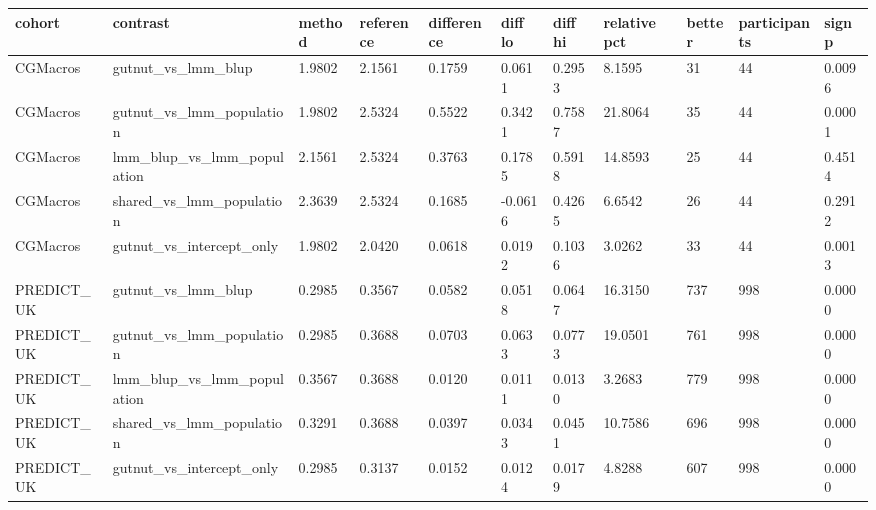 {\footnotesize\setlength{\tabcolsep}{3pt}
\begin{longtable}{lllllllllll}
\toprule
\textbf{cohort} & \textbf{contrast} & \textbf{method} & \textbf{reference} & \textbf{difference} & \textbf{diff lo} & \textbf{diff hi} & \textbf{relative pct} & \textbf{better} & \textbf{participants} & \textbf{sign p} \\
\midrule
\endhead
CGMacros & gutnut\_vs\_lmm\_blup & 1.9802 & 2.1561 & 0.1759 & 0.0611 & 0.2953 & 8.1595 & 31 & 44 & 0.0096 \\
CGMacros & gutnut\_vs\_lmm\_population & 1.9802 & 2.5324 & 0.5522 & 0.3421 & 0.7587 & 21.8064 & 35 & 44 & 0.0001 \\
CGMacros & lmm\_blup\_vs\_lmm\_population & 2.1561 & 2.5324 & 0.3763 & 0.1785 & 0.5918 & 14.8593 & 25 & 44 & 0.4514 \\
CGMacros & shared\_vs\_lmm\_population & 2.3639 & 2.5324 & 0.1685 & -0.0616 & 0.4265 & 6.6542 & 26 & 44 & 0.2912 \\
CGMacros & gutnut\_vs\_intercept\_only & 1.9802 & 2.0420 & 0.0618 & 0.0192 & 0.1036 & 3.0262 & 33 & 44 & 0.0013 \\
PREDICT\_UK & gutnut\_vs\_lmm\_blup & 0.2985 & 0.3567 & 0.0582 & 0.0518 & 0.0647 & 16.3150 & 737 & 998 & 0.0000 \\
PREDICT\_UK & gutnut\_vs\_lmm\_population & 0.2985 & 0.3688 & 0.0703 & 0.0633 & 0.0773 & 19.0501 & 761 & 998 & 0.0000 \\
PREDICT\_UK & lmm\_blup\_vs\_lmm\_population & 0.3567 & 0.3688 & 0.0120 & 0.0111 & 0.0130 & 3.2683 & 779 & 998 & 0.0000 \\
PREDICT\_UK & shared\_vs\_lmm\_population & 0.3291 & 0.3688 & 0.0397 & 0.0343 & 0.0451 & 10.7586 & 696 & 998 & 0.0000 \\
PREDICT\_UK & gutnut\_vs\_intercept\_only & 0.2985 & 0.3137 & 0.0152 & 0.0124 & 0.0179 & 4.8288 & 607 & 998 & 0.0000 \\
\bottomrule
\end{longtable}}
